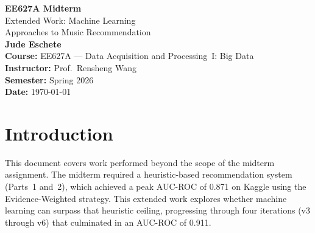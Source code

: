 \documentclass[12pt]{article}
\begin{document}
\begin{titlepage}
	\centering
	\vspace*{2cm}

	{\Huge \textbf{EE627A Midterm}}\\[0.3cm]
	{\LARGE Extended Work: Machine Learning}\\[0.3cm]
	{\LARGE Approaches to Music Recommendation}\\[2.5cm]

	{\Large \textbf{Jude Eschete}}\\[1cm]

	{\large
		\textbf{Course:} EE627A --- Data Acquisition and Processing~I: Big Data\\[0.3cm]
		\textbf{Instructor:} Prof.\ Rensheng Wang\\[0.3cm]
		\textbf{Semester:} Spring 2026\\[0.3cm]
		\textbf{Date:} \today
	}

	\vfill
\end{titlepage}

\newpage
\tableofcontents
\newpage
\listoftables
\newpage
\listofmyequations

\newpage
{}
\section{Introduction}

This document covers work performed beyond the scope of the midterm assignment. The midterm required a heuristic-based recommendation system (Parts~1 and~2), which achieved a peak AUC-ROC of 0.871 on Kaggle using the Evidence-Weighted strategy. This extended work explores whether machine learning can surpass that heuristic ceiling, progressing through four iterations (v3 through v6) that culminated in an AUC-ROC of 0.911.
\end{document}
